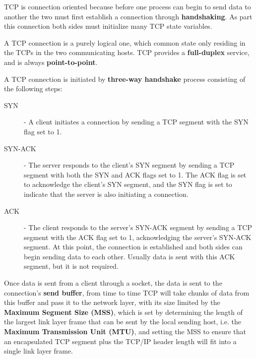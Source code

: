 \documentclass[12pt letter]{report}
\begin{document}

TCP is connection oriented because before one process can begin to
send data to another the two must first establish a connection
through \textbf{handshaking}. As part this connection both sides must
initialize many TCP state variables.



A TCP connection is a purely logical one, which common state only
residing in the TCPs in the two communicating hosts. TCP provides a
\textbf{full-duplex} service, and is always \textbf{point-to-point}.

A TCP connection is initiated by \textbf{three-way handshake} process
consisting of the following steps:
\begin{description}
  \item[SYN] - A client initiates a connection by sending a TCP
    segment with the SYN
    flag set to 1.
  \item[SYN-ACK] - The server responds to the client's SYN segment by
    sending a TCP segment with both the SYN and ACK flags set to 1.
    The ACK flag is set to acknowledge the client's SYN segment, and
    the SYN flag is set to indicate that the server is also
    initiating a connection.
  \item[ACK] - The client responds to the server's SYN-ACK segment by
    sending a TCP segment with the ACK flag set to 1, acknowledging
    the server's SYN-ACK segment. At this point, the connection is
    established and both sides can begin sending data to each other.
    Usually data is sent with this ACK segment, but it is not required.
\end{description}

Once data is sent from a client through a socket, the data is sent to
the connection's \textbf{send buffer}, from time to time TCP will
take chunks of data from this buffer and pass it to the network
layer, with its size limited by the \textbf{Maximum Segment Size
(MSS)}, which is set by determining the length of the largest link
layer frame that can be sent by the local sending host, i.e. the
\textbf{Maximum Transmission Unit (MTU)}, and setting the MSS to
ensure that an encapsulated TCP segment plus the TCP/IP header length
will fit into a single link layer frame.
\end{document}
